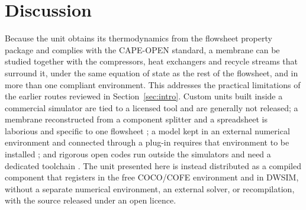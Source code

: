 \documentclass[a4paper,fleqn]{cas-dc}
\begin{document}
\section{Discussion}\label{sec:discussion}
Because the unit obtains its thermodynamics from the flowsheet property package
and complies with the CAPE-OPEN standard, a membrane can be studied together with
the compressors, heat exchangers and recycle streams that surround it, under the
same equation of state as the rest of the flowsheet, and in more than one
compliant environment. This addresses the practical limitations of the earlier
routes reviewed in Section~\ref{sec:intro}. Custom units built inside a commercial
simulator \citep{ahmad2012,bocciardo2013,salano2025} are tied to a licensed tool
and are generally not released; a membrane reconstructed from a component splitter
and a spreadsheet is laborious and specific to one flowsheet
\citep{alqaheem2024accuracy}; a model kept in an external numerical environment
and connected through a plug-in requires that environment to be installed
\citep{alqaheem2024coco}; and rigorous open codes run outside the simulators and
need a dedicated toolchain \citep{dejaco2020,aziaba2022,bozorg2019}. The unit
presented here is instead distributed as a compiled component that registers in
the free COCO/COFE environment and in DWSIM, without a
separate numerical environment, an external solver, or recompilation, with the
source released under an open licence.
\end{document}
